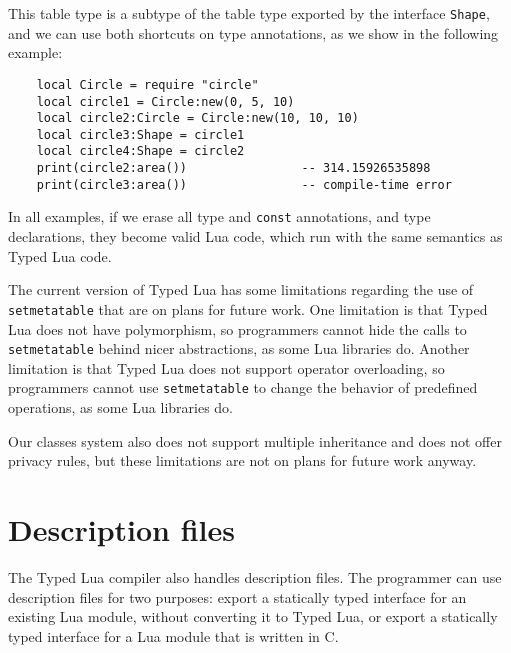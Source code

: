 This table type is a subtype of the table type exported by the interface \texttt{Shape},
and we can use both shortcuts on type annotations, as we show in the following example:
\begin{verbatim}
    local Circle = require "circle"
    local circle1 = Circle:new(0, 5, 10)
    local circle2:Circle = Circle:new(10, 10, 10)
    local circle3:Shape = circle1
    local circle4:Shape = circle2
    print(circle2:area())                -- 314.15926535898
    print(circle3:area())                -- compile-time error
\end{verbatim}

In all examples, if we erase all type and \texttt{const} annotations,
and type declarations, they become valid Lua code, which run with the
same semantics as Typed Lua code.

The current version of Typed Lua has some limitations regarding
the use of \texttt{setmetatable} that are on plans for future work.
One limitation is that Typed Lua does not have polymorphism,
so programmers cannot hide the calls to \texttt{setmetatable} behind
nicer abstractions, as some Lua libraries do.
Another limitation is that Typed Lua does not support operator overloading,
so programmers cannot use \texttt{setmetatable} to change the behavior
of predefined operations, as some Lua libraries do.

Our classes system also does not support multiple inheritance
and does not offer privacy rules, but these limitations are not
on plans for future work anyway.

\section{Description files}
\label{sec:tld}

The Typed Lua compiler also handles description files.
The programmer can use description files for two purposes:
export a statically typed interface for an existing Lua
module, without converting it to Typed Lua,
or export a statically typed interface for a Lua module
that is written in C.

